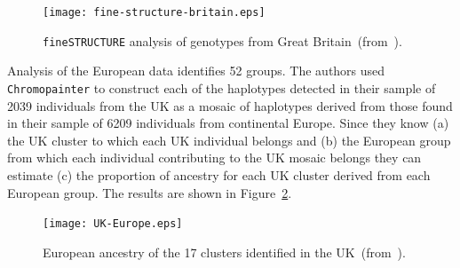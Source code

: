 \begin{figure}
\begin{center}
\texttt{[image: fine-structure-britain.eps]}
\end{center}
\caption{{\tt fineSTRUCTURE} analysis of genotypes from Great Britain~(from~\cite{Leslie-etal-2015}).}\label{fig:fine-structure}
\end{figure}

Analysis of the European data identifies 52 groups. The authors used
{\tt Chromopainter} to construct each of the haplotypes detected in
their sample of 2039 individuals from the UK as a mosaic of haplotypes
derived from those found in their sample of 6209 individuals from
continental Europe. Since they know (a) the UK cluster to which each
UK individual belongs and (b) the European group from which each
individual contributing to the UK mosaic belongs they can estimate (c)
the proportion of ancestry for each UK cluster derived from each
European group. The results are shown in Figure~\ref{fig:UK-Europe}.

\begin{figure}
\begin{center}
\texttt{[image: UK-Europe.eps]}
\end{center}
\caption{European ancestry of the 17 clusters identified in the UK~(from~\cite{Leslie-etal-2015}).}\label{fig:UK-Europe}
\end{figure}

